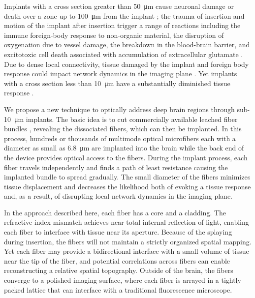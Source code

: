 Implants with a cross section 
greater than 50~\si{\micro\meter} cause neuronal damage or death over 
a zone up to 100~\si{\micro\meter} from the implant 
\cite{Seymour:2007dj}; the trauma of insertion and 
motion of the implant 
after insertion trigger a range of reactions including the immune 
foreign-body response to non-organic material, the disruption of 
oxygenation due to vessel damage, the breakdown in the blood-brain 
barrier, and excitotoxic cell death associated with accumulation of 
extracellular glutamate 
\cite{Szarowski:2003cz,Polikov:2005cq,McConnell:2009hr,Freire:2011gl}. 
Due to dense local connectivity, tissue damaged by the implant and 
foreign body response could impact network dynamics in the imaging 
plane \cite{Hayn:2015ew,Hayn:2017kj,GossVarley:2017kf}. Yet 
implants with a cross section less than 10~\si{\micro\meter} have a substantially 
diminished tissue response 
\cite{Seymour:2007dj,JohnPSeymour:2006td,Kozai:2012bp,Patel:2018cr}.

We propose a new technique to 
optically address deep brain regions through sub-10~\si{\micro\meter} 
implants. The basic idea is to cut commercially 
available leached fiber bundles \cite{Gerstner:2004to}, 
revealing the dissociated fibers, which can then be implanted. 
In this process, hundreds 
or thousands of multimode optical microfibers each with a diameter 
as small as 6.8~\si{\micro\meter} are implanted into the brain while the 
back end of the device provides optical access to the 
fibers. During the implant process, each fiber travels 
independently and finds a path of least resistance causing the 
implanted bundle to spread gradually. The small diameter of the 
fibers minimizes tissue displacement 
and decreases the likelihood both of evoking a tissue response and, 
as a result, of disrupting local network dynamics in the imaging plane.

In the approach described here, each fiber has a core and a cladding. 
The refractive index mismatch achieves near 
total internal reflection of light, enabling each fiber to interface with 
tissue near its aperture. Because of the 
splaying during insertion, the fibers will not maintain a strictly organized 
spatial mapping. Yet each fiber may provide a bidirectional interface 
with a small volume of tissue near the tip of the fiber, and potential 
correlations across fibers can enable reconstructing a relative spatial 
topography. Outside of the brain, the fibers converge to a polished 
imaging surface, where each fiber is arrayed in a tightly packed 
lattice that can interface with a traditional fluorescence microscope. 

